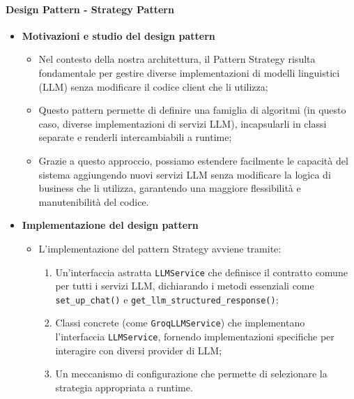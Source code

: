 \documentclass[10pt]{article}
\begin{document}
    \paragraph{Design Pattern - Strategy Pattern}
    \begin{itemize} 
    \item \textbf{Motivazioni e studio del design pattern}
    \begin{itemize}
        \item Nel contesto della nostra architettura, il Pattern Strategy risulta fondamentale per gestire diverse implementazioni di modelli linguistici (LLM) senza modificare il codice client che li utilizza;
        \item Questo pattern permette di definire una famiglia di algoritmi (in questo caso, diverse implementazioni di servizi LLM), incapsularli in classi separate e renderli intercambiabili a runtime;
        \item Grazie a questo approccio, possiamo estendere facilmente le capacità del sistema aggiungendo nuovi servizi LLM senza modificare la logica di business che li utilizza, garantendo una maggiore flessibilità e manutenibilità del codice.
    \end{itemize}
    
    \item \textbf{Implementazione del design pattern}
    \begin{itemize}
        \item L'implementazione del pattern Strategy avviene tramite:
        \begin{enumerate}
            \item Un'interfaccia astratta \texttt{LLMService} che definisce il contratto comune per tutti i servizi LLM, dichiarando i metodi essenziali come \texttt{set\_up\_chat()} e \texttt{get\_llm\_structured\_response()};
            \item Classi concrete (come \texttt{GroqLLMService}) che implementano l'interfaccia \texttt{LLMService}, fornendo implementazioni specifiche per interagire con diversi provider di LLM;
            \item Un meccanismo di configurazione che permette di selezionare la strategia appropriata a runtime.
        \end{enumerate}
    \end{itemize}
    

\end{itemize}
\end{document}
